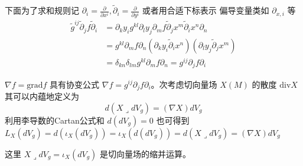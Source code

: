 下面为了求和规则记 $\partial_i = \frac{\partial}{\partial x^i},\tilde{\partial}_i = \frac{\partial}{\partial y^i}$ 或者用合适下标表示
偏导变量类如 $\partial_{x,i}$ 等
\begin{align*}
    \tilde{g}^{ij}\tilde{\partial}_j f \tilde{\partial}_i & = \partial_k y_i g^{kl} \partial_l y_j \partial_m f \tilde{\partial}_{j}x^m \tilde{\partial}_i x^n \partial_n \\
                & = g^{kl}\partial_m f \partial_n  (\partial_k y_i \tilde{\partial}_i x^n ) (\partial_l y_j \tilde{\partial}_{j}x^m )\\
                & =  \delta_{kn} \delta_{lm} g^{kl}\partial_m f \partial_n = g^{ij}\partial_j f \partial_i 
\end{align*}

$\nabla f = \mathrm{grad} f $ 具有协变公式 $\nabla f = g^{ij}\partial_j f \partial_i $。次考虑切向量场 $X(M)$
的散度 $\mathrm{div} X$ 其可以内蕴地定义为
\begin{equation*}
    d (X \mathrel{\lrcorner} dV_g) = (\nabla X) dV_g
\end{equation*}
利用李导数的Cartan公式和 $d (dV_g) = 0$ 也可得到 $L_X (dV_g) = d (\iota_X (dV_g)) = \iota_X(d(dV_g)) =  d (X \mathrel{\lrcorner} dV_g)  = (\nabla X) dV_g$

这里 $X \lrcorner dV_g = \iota_X (dV_g)$ 是切向量场的缩并运算。

